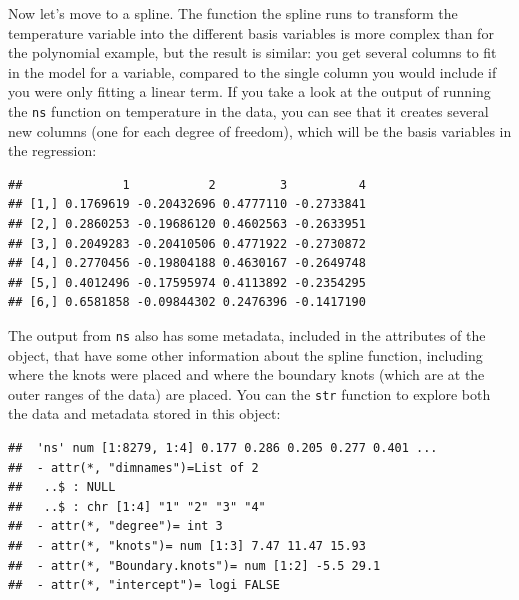 \documentclass[
]{book}
\newenvironment{Shaded}{\begin{snugshade}}{\end{snugshade}}
\newcommand{\AttributeTok}[1]{\textcolor[rgb]{0.13,0.29,0.53}{#1}}
\newcommand{\DecValTok}[1]{\textcolor[rgb]{0.00,0.00,0.81}{#1}}
\newcommand{\FunctionTok}[1]{\textcolor[rgb]{0.13,0.29,0.53}{\textbf{#1}}}
\newcommand{\NormalTok}[1]{#1}
\newcommand{\SpecialCharTok}[1]{\textcolor[rgb]{0.81,0.36,0.00}{\textbf{#1}}}
\begin{document}
Now let's move to a spline. The function the spline runs to transform the temperature
variable into the different basis variables is more complex than for the polynomial example,
but the result is similar: you get several columns to fit in the model for a variable, compared
to the single column you would include if you were only fitting a linear term. If you
take a look at the output of running the \texttt{ns} function on temperature in the data, you can
see that it creates several new columns (one for each degree of freedom), which will be the
basis variables in the regression:

\begin{Shaded}
\end{Shaded}

\begin{verbatim}
##              1           2         3          4
## [1,] 0.1769619 -0.20432696 0.4777110 -0.2733841
## [2,] 0.2860253 -0.19686120 0.4602563 -0.2633951
## [3,] 0.2049283 -0.20410506 0.4771922 -0.2730872
## [4,] 0.2770456 -0.19804188 0.4630167 -0.2649748
## [5,] 0.4012496 -0.17595974 0.4113892 -0.2354295
## [6,] 0.6581858 -0.09844302 0.2476396 -0.1417190
\end{verbatim}

The output from \texttt{ns} also has some metadata, included in the attributes of the object, that
have some other information about the spline function, including where the knots were
placed and where the boundary knots (which are at the outer ranges of the data) are placed.
You can the \texttt{str} function to explore both the data and metadata stored in this object:

\begin{Shaded}
\end{Shaded}

\begin{verbatim}
##  'ns' num [1:8279, 1:4] 0.177 0.286 0.205 0.277 0.401 ...
##  - attr(*, "dimnames")=List of 2
##   ..$ : NULL
##   ..$ : chr [1:4] "1" "2" "3" "4"
##  - attr(*, "degree")= int 3
##  - attr(*, "knots")= num [1:3] 7.47 11.47 15.93
##  - attr(*, "Boundary.knots")= num [1:2] -5.5 29.1
##  - attr(*, "intercept")= logi FALSE
\end{verbatim}
\end{document}
